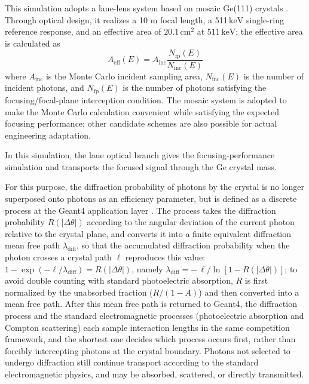 \documentclass[11pt]{article}
\newcommand{\keV}{\ensuremath{\,\mathrm{keV}}}
\begin{document}
This simulation adopts a laue-lens system based on mosaic Ge(111) crystals \cite{Barriere2009Laue,Barriere2011LauePrototype}. Through optical design, it realizes a 10 m focal length, a 511\keV{} single-ring reference response, and an effective area of $20.1\,\mathrm{cm^2}$ at 511\keV; the effective area is calculated as
\begin{equation}
  A_{\mathrm{eff}}(E)=A_{\mathrm{inc}}\frac{N_{\mathrm{fp}}(E)}{N_{\mathrm{inc}}(E)}
  \label{eq:laue_aeff}
\end{equation}
where $A_{\mathrm{inc}}$ is the Monte Carlo incident sampling area, $N_{\mathrm{inc}}(E)$ is the number of incident photons, and $N_{\mathrm{fp}}(E)$ is the number of photons satisfying the focusing/focal-plane interception condition.
The mosaic system is adopted to make the Monte Carlo calculation convenient while satisfying the expected focusing performance; other candidate schemes are also possible for actual engineering adaptation.

In this simulation, the laue optical branch gives the focusing-performance simulation and transports the focused signal through the Ge crystal mass.

For this purpose, the diffraction probability of photons by the crystal is no longer superposed onto photons as an efficiency parameter, but is defined as a discrete process at the Geant4 application layer \cite{Agostinelli2003,Allison2016}. The process takes the diffraction probability $R(|\Delta\theta|)$ according to the angular deviation of the current photon relative to the crystal plane, and converts it into a finite equivalent diffraction mean free path $\lambda_{\mathrm{diff}}$, so that the accumulated diffraction probability when the photon crosses a crystal path $\ell$ reproduces this value: $1-\exp(-\ell/\lambda_{\mathrm{diff}})=R(|\Delta\theta|)$, namely $\lambda_{\mathrm{diff}}=-\,\ell/\ln[1-R(|\Delta\theta|)]$; to avoid double counting with standard photoelectric absorption, $R$ is first normalized by the unabsorbed fraction ($R/(1-A)$) and then converted into a mean free path. After this mean free path is returned to Geant4, the diffraction process and the standard electromagnetic processes (photoelectric absorption and Compton scattering) each sample interaction lengths in the same competition framework, and the shortest one decides which process occurs first, rather than forcibly intercepting photons at the crystal boundary. Photons not selected to undergo diffraction still continue transport according to the standard electromagnetic physics, and may be absorbed, scattered, or directly transmitted.
\end{document}

